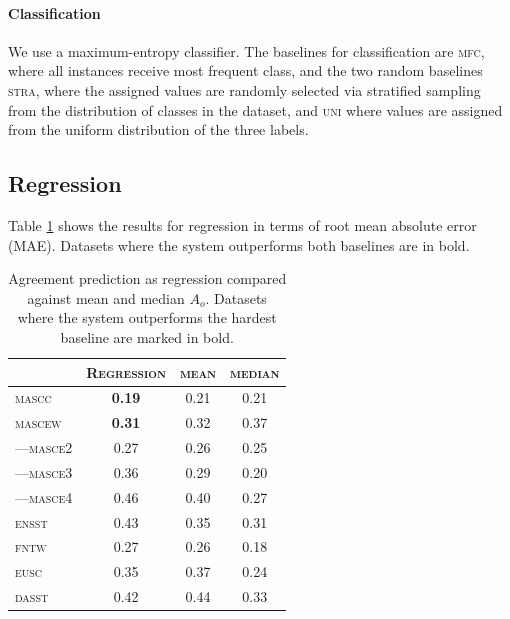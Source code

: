 \documentclass[11pt,a4paper]{article}
\begin{document}
\paragraph{Classification} We use a maximum-entropy classifier. The baselines for classification are \textsc{mfc}, where all instances receive most frequent class, and the two random baselines \textsc{stra}, where the assigned values are randomly selected via stratified sampling from the distribution of classes in the dataset, and \textsc{uni} where values are assigned from the uniform distribution of the three labels. 

\subsection{Regression}
\label{sec:reg}
Table \ref{tab:regagr_results} shows the results for regression in terms of root mean absolute error (MAE). Datasets where the system outperforms both baselines are in bold.


\begin{table}[Ht!]

\begin{center}
  \begin{tabular}{lc|cc}
 \toprule
 & \textsc{Regression} & \textsc{mean} & \textsc{median} \\
 \midrule
 \textsc{mascc} & \textbf{0.19} & 0.21 & 0.21 \\
 \textsc{mascew} & \textbf{0.31} & 0.32 & 0.37 \\
---\textsc{masce2} & {0.27} & 0.26 & 0.25 \\
---\textsc{masce3} & {0.36} & 0.29 & 0.20 \\
---\textsc{masce4} & {0.46} & 0.40 & 0.27 \\
\textsc{ensst} & {0.43} & 0.35 & 0.31 \\
\textsc{fntw} & {0.27} & 0.26 & 0.18 \\

\textsc{eusc} & 0.35 & 0.37 & 0.24 \\
\textsc{dasst} & 0.42 & 0.44 & 0.33 \\

\bottomrule

  \end{tabular}  
\end{center}
\caption{Agreement prediction as regression compared against mean and median $A_o$. Datasets where the system outperforms the hardest baseline are marked in bold. \label{tab:regagr_results}}
\end{table} 
\end{document}
